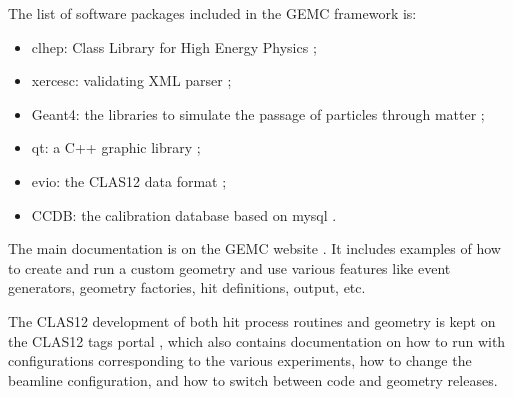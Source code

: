 The list of software packages included in the GEMC framework is:

\begin{itemize}
	\item clhep: Class Library for High Energy Physics \cite{clhep};
	\item xercesc: validating XML parser \cite{xercesc};
	\item Geant4: the libraries to simulate the passage of particles through matter \cite{geant4};
	\item qt: a C++ graphic library \cite{qt};
	\item evio: the CLAS12 data format \cite{evio};
	\item CCDB: the calibration database based on mysql \cite{ccdb}.
\end{itemize}

The main documentation is on the GEMC website \cite{GEMC}. It includes examples of how to create and run a custom geometry
and use various features like event generators, geometry factories, hit definitions, output, etc.

The CLAS12 development of both hit process routines and geometry is kept on the CLAS12 tags portal \cite{clas12Tags},
which also contains documentation on how to run with configurations corresponding to the various experiments, how to change the
beamline configuration, and how to switch between code and geometry releases.





